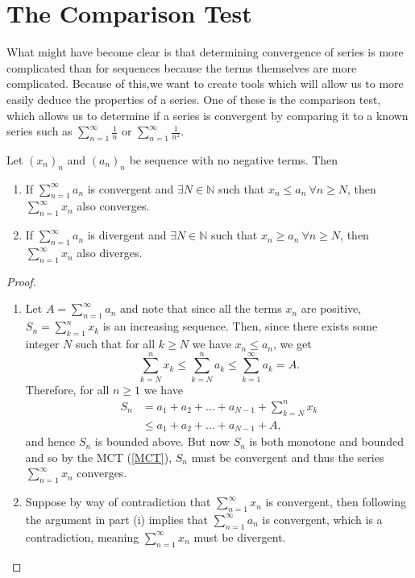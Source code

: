 \documentclass[../real_analysis.tex]{subfiles}
\begin{document}
    \section{The Comparison Test}
        What might have become clear is that determining convergence of series is more complicated than for sequences because the terms themselves are more complicated. Because of this,we want to create tools which will allow us to more easily deduce the properties of a series. One of these is the comparison test, which allows us to determine if a series is convergent by comparing it to a known series such as $\sum_{n=1}^\infty\frac{1}{n}$ or $\sum_{n=1}^\infty\frac{1}{n^2}$.
        \begin{theorem}\label{comparison-test}
            Let $(x_n)_n$ and $(a_n)_n$ be sequence with no negative terms. Then
            \begin{enumerate}[label={\upshape(\roman*)}]
                \item If $\sum_{n=1}^\infty a_n$ is convergent and $\exists N\in\mathbb{N}$ such that $x_n\leq a_n\ \forall n\geq N$, then $\sum_{n=1}^\infty x_n$ also converges.
                \item If $\sum_{n=1}^\infty a_n$ is divergent and $\exists N\in\mathbb{N}$ such that $x_n\geq a_n\ \forall n\geq N$, then $\sum_{n=1}^\infty x_n$ also diverges.
            \end{enumerate}
        \end{theorem}
        \begin{proof}\\
            \begin{enumerate}[label={\upshape(\roman*)}]
                \item Let $A=\sum_{n=1}^\infty a_n$ and note that since all the terms $x_n$ are positive, $S_n=\sum_{k=1}^n x_k$ is an increasing sequence. Then, since there exists some integer $N$ such that for all $k\geq N$ we have $x_n\leq a_n$, we get
                \begin{equation}
                    \sum_{k=N}^n x_k\leq\sum_{k=N}^n a_k\leq\sum_{k=1}^\infty a_k=A.
                \end{equation}
                Therefore, for all $n\geq1$ we have
                \begin{align}
                    S_n&=a_1+a_2+\dots+a_{N-1}+\sum_{k=N}^n x_k\\
                    &\leq a_1+a_2+\dots+a_{N-1}+A,
                \end{align}
                and hence $S_n$ is bounded above. But now $S_n$ is both monotone and bounded and so by the MCT (\ref{MCT}), $S_n$ must be convergent and thus the series $\sum_{n=1}^\infty x_n$ converges.
                \item Suppose by way of contradiction that $\sum_{n=1}^\infty x_n$ is convergent, then following the argument in part (i) implies that $\sum_{n=1}^\infty a_n$ is convergent, which is a contradiction, meaning $\sum_{n=1}^\infty x_n$ must be divergent.
            \end{enumerate}
        \end{proof}
\end{document}
